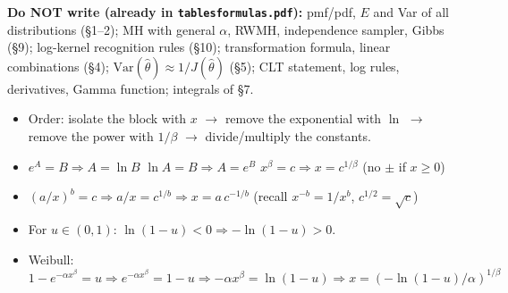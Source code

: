 \documentclass[10pt]{article}
\newcommand{\R}[1]{\texttt{#1}}
\newcommand{\always}{\textcolor{always}{$\bullet$}}
\newcommand{\sub}[1]{\par\vspace{4pt}{\bfseries #1}\par\vspace{1pt}}
\renewcommand{\section}[1]{\par\vspace{8pt}{\large\bfseries\color{head}#1}\par\vspace{1pt}{\color{head}\hrule}\vspace{3pt}}
\begin{document}
\vspace{3pt}
{\small\textbf{Do NOT write (already in \R{tablesformulas.pdf}):} pmf/pdf, $E$ and Var of all distributions (\S1--2); MH with general $\alpha$, RWMH, independence sampler, Gibbs (\S9); log-kernel recognition rules (\S10); transformation formula, linear combinations (\S4); $\mathrm{Var}(\hat\theta)\approx 1/J(\hat\theta)$ (\S5); CLT statement, log rules, derivatives, Gamma function; integrals of \S7.}

\section{\always{} 0. Maths}

\sub{A. Solve $u=F(x)$ for $x$ (used in 1 Inversion)}
\begin{itemize}
\item Order: isolate the block with $x$ $\to$ remove the exponential with $\ln$ $\to$ remove the power with $1/\beta$ $\to$ divide/multiply the constants.
\item $e^A=B \Rightarrow A=\ln B$ \quad $\ln A=B \Rightarrow A=e^B$ \quad $x^\beta=c \Rightarrow x=c^{1/\beta}$ (no $\pm$ if $x\ge0$)
\item $(a/x)^b=c \Rightarrow a/x=c^{1/b} \Rightarrow x=a\,c^{-1/b}$ \quad (recall $x^{-b}=1/x^b$, $c^{1/2}=\sqrt c$)
\item For $u\in(0,1)$: $\ln(1-u)<0 \Rightarrow -\ln(1-u)>0$.
\item Weibull: $1-e^{-\alpha x^\beta}=u \Rightarrow e^{-\alpha x^\beta}=1-u \Rightarrow -\alpha x^\beta=\ln(1-u) \Rightarrow x=\left(-\ln(1-u)/\alpha\right)^{1/\beta}$
\end{itemize}
\end{document}

